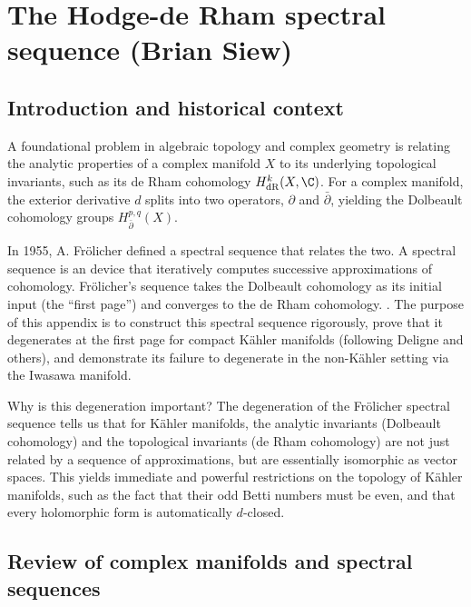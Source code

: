 \section{The Hodge-de Rham spectral sequence (Brian Siew)}

\subsection{Introduction and historical context}

A foundational problem in algebraic topology and complex geometry is relating the analytic properties of a complex manifold $X$ to its underlying topological invariants, such as its de Rham cohomology $H^k_\mathrm{dR}(X, \C)$. For a complex manifold, the exterior derivative $d$ splits into two operators, $\partial$ and $\bar\partial$, yielding the Dolbeault cohomology groups $H^{p,q}_{\bar{\partial}}(X)$.

\medskip

\noindent In 1955, A. Fr\"olicher defined a spectral sequence that relates the two. A spectral sequence is an device that iteratively computes successive approximations of cohomology. Fr\"olicher's sequence takes the Dolbeault cohomology as its initial input (the ``first page'') and converges to the de Rham cohomology. \cite{Frolicher1955}. The purpose of this appendix is to construct this spectral sequence rigorously, prove that it degenerates at the first page for compact K\"ahler manifolds (following Deligne and others), and demonstrate its failure to degenerate in the non-K\"ahler setting via the Iwasawa manifold.

\medskip

\noindent Why is this degeneration important? The degeneration of the Fr\"olicher spectral sequence tells us that for K\"ahler manifolds, the analytic invariants (Dolbeault cohomology) and the topological invariants (de Rham cohomology) are not just related by a sequence of approximations, but are essentially isomorphic as vector spaces. This yields immediate and powerful restrictions on the topology of K\"ahler manifolds, such as the fact that their odd Betti numbers must be even, and that every holomorphic form is automatically $d$-closed.

\subsection{Review of complex manifolds and spectral sequences}


